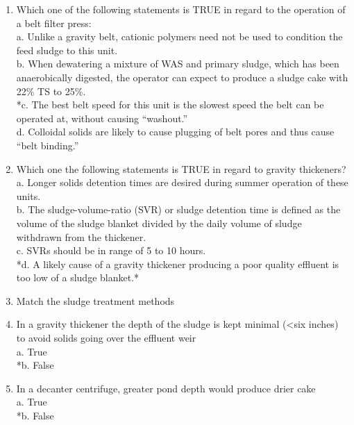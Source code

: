 \documentclass{article}
\begin{document}
\begin{enumerate}
\item  Which one of the following statements is TRUE in regard to the operation of a belt filter press: \\

a. Unlike a gravity belt, cationic polymers need not be used to condition the feed sludge to this unit. \\
b. When dewatering a mixture of WAS and primary sludge, which has been anaerobically digested, the operator can expect to produce a sludge cake with 22\% TS to 25\%. \\
*c. The best belt speed for this unit is the slowest speed the belt can be operated at, without causing “washout.” \\
d. Colloidal solids are likely to cause plugging of belt pores and thus cause “belt binding.” \\

\item  Which one the following statements is TRUE in regard to gravity thickeners? \\

a. Longer solids detention times are desired during summer operation of these units. \\
b. The sludge-volume-ratio (SVR) or sludge detention time is defined as the volume of the sludge blanket divided by the daily volume of sludge withdrawn from the thickener. \\
c. SVRs should be in range of 5 to 10 hours. \\
*d. A likely cause of a gravity thickener producing a poor quality effluent is too low of a sludge blanket.* \\

\item  Match the sludge treatment methods \\

\item  In a gravity thickener the depth of the sludge is kept minimal (<six inches) to avoid solids going over the effluent weir \\

a. True \\
*b. False \\

\item  In a decanter centrifuge, greater pond depth would produce drier cake \\

a. True \\
*b. False \\


\end{enumerate}
\end{document}
